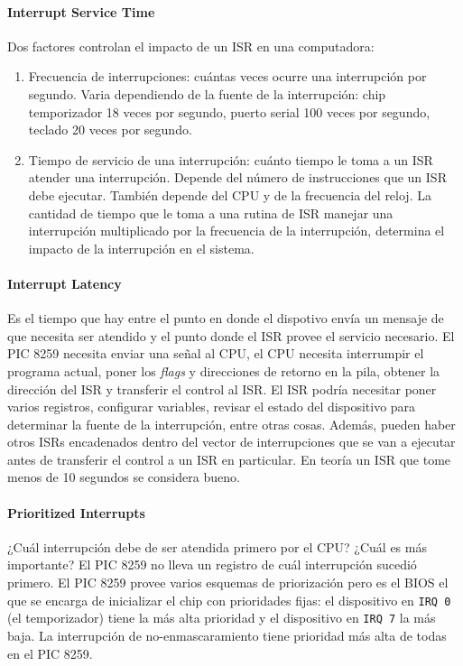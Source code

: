 \paragraph{Interrupt Service Time}
Dos factores controlan el impacto de un ISR en una computadora:
\begin{enumerate}
    \item Frecuencia de interrupciones: cuántas veces ocurre una interrupción por segundo. Varia dependiendo de la fuente de la interrupción: chip temporizador 18 veces por segundo, puerto serial 100 veces por segundo, teclado 20 veces por segundo.
    \item Tiempo de servicio de una interrupción: cuánto tiempo le toma a un ISR atender una interrupción. Depende del número de instrucciones que un ISR debe ejecutar. También depende del CPU y de la frecuencia del reloj. La cantidad de tiempo que le toma a una rutina de ISR manejar una interrupción multiplicado por la frecuencia de la interrupción, determina el impacto de la interrupción en el sistema.
\end{enumerate}

\paragraph{Interrupt Latency}
Es el tiempo que hay entre el punto en donde el dispotivo envía un mensaje de que necesita ser atendido y el punto donde el ISR provee el servicio necesario. El PIC 8259 necesita enviar una señal al CPU, el CPU necesita interrumpir el programa actual, poner los \textit{flags} y direcciones de retorno en la pila, obtener la dirección del ISR y transferir el control al ISR. El ISR podría necesitar poner varios registros, configurar variables, revisar el estado del dispositivo para determinar la fuente de la interrupción, entre otras cosas. Además, pueden haber otros ISRs encadenados dentro del vector de interrupciones que se van a ejecutar antes de transferir el control a un ISR en particular. En teoría un ISR que tome menos de 10 segundos se considera bueno.

\paragraph{Prioritized Interrupts}
¿Cuál interrupción debe de ser atendida primero por el CPU? ¿Cuál es más importante? El PIC 8259 no lleva un registro de cuál interrupción sucedió primero. El PIC 8259 provee varios esquemas de priorización pero es el BIOS el que se encarga de inicializar el chip con prioridades fijas: el dispositivo en \texttt{IRQ 0} (el temporizador) tiene la más alta prioridad y el dispositivo en \texttt{IRQ 7} la más baja. La interrupción de no-enmascaramiento tiene prioridad más alta de todas en el PIC 8259.

